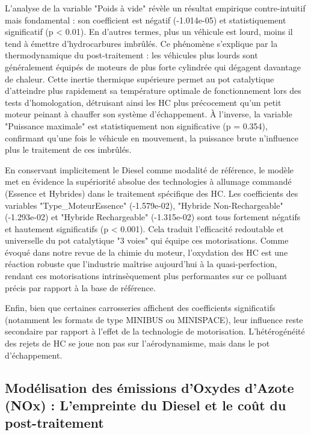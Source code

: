 L'analyse de la variable "Poids à vide" révèle un résultat empirique contre-intuitif mais fondamental : son coefficient est négatif (-1.014e-05) et statistiquement significatif (p < 0.01). En d'autres termes, plus un véhicule est lourd, moins il tend à émettre d'hydrocarbures imbrûlés. Ce phénomène s'explique par la thermodynamique du post-traitement : les véhicules plus lourds sont généralement équipés de moteurs de plus forte cylindrée qui dégagent davantage de chaleur. Cette inertie thermique supérieure permet au pot catalytique d'atteindre plus rapidement sa température optimale de fonctionnement lors des tests d'homologation, détruisant ainsi les HC plus précocement qu'un petit moteur peinant à chauffer son système d'échappement. À l'inverse, la variable "Puissance maximale" est statistiquement non significative (p = 0.354), confirmant qu'une fois le véhicule en mouvement, la puissance brute n'influence plus le traitement de ces imbrûlés.

\vspace{0.6em}

En conservant implicitement le Diesel comme modalité de référence, le modèle met en évidence la supériorité absolue des technologies à allumage commandé (Essence et Hybrides) dans le traitement spécifique des HC. Les coefficients des variables "Type\_MoteurEssence" (-1.579e-02), "Hybride Non-Rechargeable" (-1.293e-02) et "Hybride Rechargeable" (-1.315e-02) sont tous fortement négatifs et hautement significatifs (p < 0.001). Cela traduit l'efficacité redoutable et universelle du pot catalytique "3 voies" qui équipe ces motorisations. Comme évoqué dans notre revue de la chimie du moteur, l'oxydation des HC est une réaction robuste que l'industrie maîtrise aujourd'hui à la quasi-perfection, rendant ces motorisations intrinsèquement plus performantes sur ce polluant précis par rapport à la base de référence.

\vspace{0.6em}

Enfin, bien que certaines carrosseries affichent des coefficients significatifs (notamment les formats de type MINIBUS ou MINISPACE), leur influence reste secondaire par rapport à l'effet de la technologie de motorisation. L'hétérogénéité des rejets de HC se joue non pas sur l'aérodynamisme, mais dans le pot d'échappement.

\subsection{Modélisation des émissions d'Oxydes d'Azote (NOx) : L'empreinte du Diesel et le coût du post-traitement}

